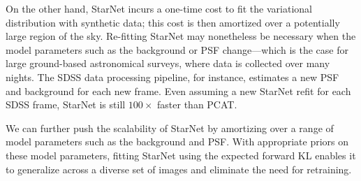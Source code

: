 On the other hand, StarNet incurs a one-time cost to fit the variational distribution with synthetic data; this cost is then amortized over a potentially large region of the sky.
Re-fitting StarNet may nonetheless be necessary when the model parameters
such as the background or PSF change---which is the case for 
large ground-based astronomical surveys, where data is collected over many nights. 
The SDSS data processing pipeline, for instance, estimates a new PSF and background
for each new frame. 
Even assuming a new StarNet refit for each SDSS frame, 
StarNet is still $100\times$ faster than PCAT. 

We can further push the scalability of StarNet by 
amortizing over a range of model parameters such as the background and PSF. 
With appropriate priors on these model parameters,
fitting StarNet using the  
expected forward KL enables it to generalize across a diverse set of images 
and eliminate the need for retraining.

